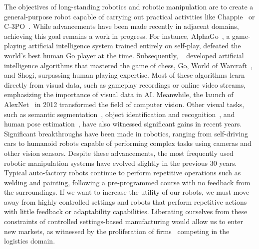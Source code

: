 The objectives of long-standing robotics and robotic manipulation are to create a general-purpose robot capable of carrying out practical activities like Chappie~\cite{blomkamp2015chappie} or C-3PO~\cite{lucas1977star}. While advancements have been made recently in adjacent domains, achieving this goal remains a work in progress. For instance, AlphaGo~\cite{silver2018general},
a game-playing artificial intelligence system trained entirely on self-play, defeated the world's best human Go player at the time. Subsequently, \citeauthor{silver2016mastering}~\cite{silver2016mastering}
developed artificial intelligence algorithms that mastered the game of chess, Go, World of Warcraft~\cite{entertainment2013world}, and Shogi,
surpassing human playing expertise. Most of these algorithms learn directly from visual data, such as gameplay recordings or online video streams, emphasizing the importance of visual data in AI. Meanwhile, the launch of AlexNet~\cite{krizhevsky2017imagenet} in 2012 transformed the field of computer vision. Other visual tasks, such as semantic segmentation~\cite{long2015fully}, object identification and recognition~\cite{he2017mask}, and human pose estimation~\cite{guler2018densepose}, have also witnessed significant gains in recent years. Significant breakthroughs have been made in robotics, ranging from self-driving cars to humanoid robots capable of performing complex tasks using cameras and other vision sensors. Despite these advancements, the most frequently used robotic manipulation systems have evolved slightly in the previous 30 years. Typical auto-factory robots continue to perform repetitive operations such as welding and painting, following a pre-programmed course with no feedback from the surroundings. If we want to increase the utility of our robots, we must move away from highly controlled settings and robots that perform repetitive actions with little feedback or adaptability capabilities. Liberating ourselves from these constraints of controlled settings-based manufacturing would allow us to enter new markets, as witnessed by the proliferation of firms~\cite{sereact} competing in the logistics domain.


